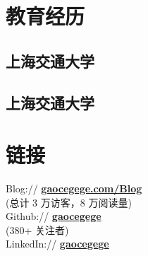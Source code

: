 \documentclass[]{deedy-resume-openfont}
\begin{document}
    
    \lastupdated
    
    
    
    \begin{minipage}[t]{0.25\textwidth} 
    
    
    \section{教育经历} 
    \sectionsep
    
    \subsection{上海交通大学}
    \sectionsep
    
    \subsection{上海交通大学}
    \sectionsep
    
    
    \section{链接}
    \sectionsep
    Blog://  \href{http://gaocegege.com/Blog}{\bf gaocegege.com/Blog} \\
    (总计 3 万访客，8 万阅读量) \\    
    Github:// \href{https://github.com/gaocegege}{\bf gaocegege} \\
    (380+ 关注者) \\
    LinkedIn://  \href{https://www.linkedin.com/in/gaocegege}{\bf gaocegege} \\
    

\end{minipage}
\end{document}
